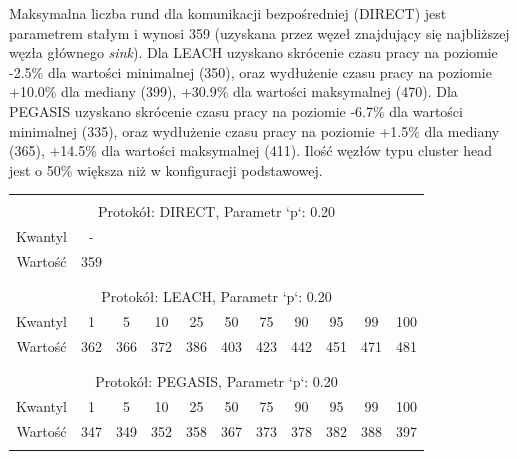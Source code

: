 \documentclass[a4paper,12pt,twoside,openany]{report}
\begin{document}
\par
Maksymalna liczba rund dla komunikacji bezpośredniej (DIRECT) jest parametrem stałym i wynosi 359 (uzyskana przez węzeł znajdujący się najbliższej węzła głównego \textit{sink}).
Dla LEACH uzyskano skrócenie czasu pracy na poziomie -2.5\% dla wartości minimalnej (350), oraz wydłużenie czasu pracy na poziomie +10.0\% dla mediany (399), +30.9\% dla wartości maksymalnej (470).
Dla PEGASIS uzyskano skrócenie czasu pracy na poziomie -6.7\% dla wartości minimalnej (335), oraz wydłużenie czasu pracy na poziomie +1.5\% dla mediany (365), +14.5\% dla wartości maksymalnej (411).
Ilość węzłów typu cluster head jest o 50\% większa niż w konfiguracji podstawowej.

\begin{longtable}{*{11}{c}}
\toprule \\*
\multicolumn{11}{c}{Protokół: DIRECT, Parametr `p`: 0.20} \\*
Kwantyl	& -	\\*
Wartość	& 359	\\*
\midrule \\*
\\*
\multicolumn{11}{c}{Protokół: LEACH, Parametr `p`: 0.20} \\*
Kwantyl	& 1	& 5	& 10	& 25	& 50	& 75	& 90	& 95	& 99	& 100	\\*
Wartość	& 362	& 366	& 372	& 386	& 403	& 423	& 442	& 451	& 471	& 481	\\*
\midrule \\*
\\*
\multicolumn{11}{c}{Protokół: PEGASIS, Parametr `p`: 0.20} \\*
Kwantyl	& 1	& 5	& 10	& 25	& 50	& 75	& 90	& 95	& 99	& 100	\\*
Wartość	& 347	& 349	& 352	& 358	& 367	& 373	& 378	& 382	& 388	& 397	\\*	
\bottomrule \\*
\end{longtable}
\end{document}
